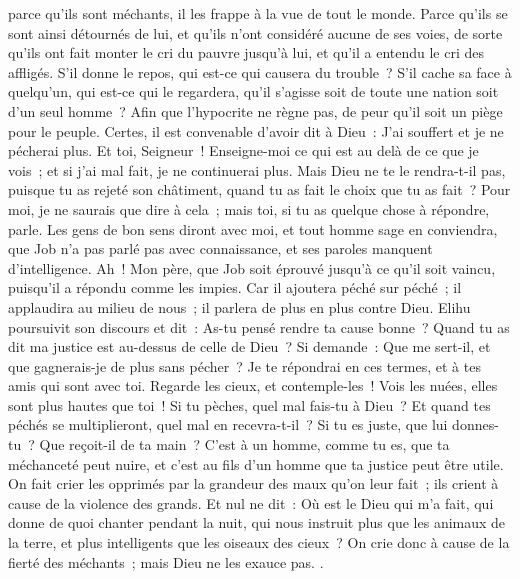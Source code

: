 \begin{multicols}{2}
parce qu'ils sont méchants, il les frappe à la vue de tout le monde.
Parce qu'ils se sont ainsi détournés de lui, et qu'ils n'ont considéré aucune de ses voies,
de sorte qu'ils ont fait monter le cri du pauvre jusqu'à lui, et qu'il a entendu le cri des affligés.
S'il donne le repos, qui est-ce qui causera du trouble~? S'il cache sa face à quelqu'un, qui est-ce qui le regardera, qu'il s'agisse soit de toute une nation soit d'un seul homme~?
Afin que l'hypocrite ne règne pas, de peur qu'il soit un piège pour le peuple.
Certes, il est convenable d'avoir dit à Dieu~: J'ai souffert et je ne pécherai plus.
Et toi, Seigneur~! Enseigne-moi ce qui est au delà de ce que je vois~; et si j'ai mal fait, je ne continuerai plus. 
Mais Dieu ne te le rendra-t-il pas, puisque tu as rejeté son châtiment, quand tu as fait le choix que tu as fait~? Pour moi, je ne saurais que dire à cela~; mais toi, si tu as quelque chose à répondre, parle.
Les gens de bon sens diront avec moi, et tout homme sage en conviendra,
que Job n'a pas parlé pas avec connaissance, et ses paroles manquent d'intelligence.
Ah~! Mon père, que Job soit éprouvé jusqu'à ce qu'il soit vaincu, puisqu'il a répondu comme les impies.
Car il ajoutera péché sur péché~; il applaudira au milieu de nous~; il parlera de plus en plus contre Dieu.
\VerseOne{}Elihu poursuivit son discours et dit~:
As-tu pensé rendre ta cause bonne~? Quand tu as dit ma justice est au-dessus de celle de Dieu~?
Si demande~: Que me sert-il, et que gagnerais-je de plus sans pécher~?
Je te répondrai en ces termes, et à tes amis qui sont avec toi.
Regarde les cieux, et contemple-les~! Vois les nuées, elles sont plus hautes que toi~!
Si tu pèches, quel mal fais-tu à Dieu~? Et quand tes péchés se multiplieront, quel mal en recevra-t-il~?
Si tu es juste, que lui donnes-tu~? Que reçoit-il de ta main~?
C'est à un homme, comme tu es, que ta méchanceté peut nuire, et c'est au fils d'un homme que ta justice peut être utile.
On fait crier les opprimés par la grandeur des maux qu'on leur fait~; ils crient à cause de la violence des grands.
Et nul ne dit~: Où est le Dieu qui m'a fait, qui donne de quoi chanter pendant la nuit,
qui nous instruit plus que les animaux de la terre, et plus intelligents que les oiseaux des cieux~?
On crie donc à cause de la fierté des méchants~; mais Dieu ne les exauce pas.
.

\end{multicols}
